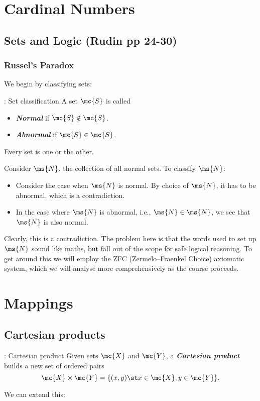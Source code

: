 \section{Cardinal Numbers}
\subsection{Sets and Logic (Rudin pp 24-30)}
\subsubsection{Russel's Paradox}
We begin by classifying sets:
\begin{ndef}{: Set classification}
	A set \(\mc{S}\) is called 
	\begin{itemize}
		\item \emph{\textbf{Normal}} if \(\mc{S}\notin \mc{S}\).
		
		\item \emph{\textbf{Abnormal}} if \(\mc{S}\in \mc{S}\).
	\end{itemize}
	Every set is one or the other.
\end{ndef}
Consider \(\ms{N}\), the collection of all normal sets. To classify \(\ms{N}\):
\begin{itemize}
	\item  Consider the case when \(\ms{N}\) is normal. By choice of \(\ms{N}\), it has to be abnormal, which is a contradiction.
	
	\item In the case where \(\ms{N}\) is abnormal, i.e., \(\ms{N}\in\ms{N}\), we see that \(\ms{N}\) is also normal.
\end{itemize}
Clearly, this is a contradiction. The problem here is that the words used to set up \(\ms{N}\) sound like maths, but fall out of the scope for safe logical reasoning. To get around this we will employ the ZFC (Zermelo–Fraenkel Choice) axiomatic system, which we will analyse more comprehensively as the course proceeds.

\clearpage

\section{Mappings}
\subsection{Cartesian products}
\begin{ndef}{: Cartesian product}
	Given sets \(\mc{X}\) and \(\mc{Y}\), a \emph{\textbf{Cartesian product}} builds a new set of ordered pairs 
	\begin{equation*}
		\mc{X}\times \mc{Y}=\{(x,y)\st x\in \mc{X},y\in \mc{Y}\}.
	\end{equation*}
\end{ndef}
We can extend this:

